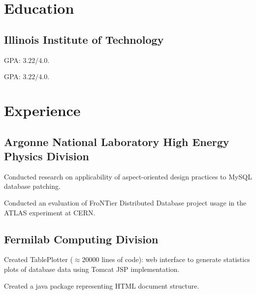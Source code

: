 \documentclass{resume}
\begin{document}
\author{Dmitry Ratnikov}
\maketitle

\section{Education}

\subsection{Illinois Institute of Technology}

\begin{compactitem}
  \item GPA: $3.22/4.0$.
\end{compactitem}

\begin{compactitem}
  \item GPA: $3.22/4.0$.
\end{compactitem}

\section{Experience}

\subsection{Argonne National Laboratory High Energy Physics Division}
\begin{compactitem}
  \item Conducted research on applicability of aspect-oriented design practices to MySQL database patching.
  \item Conducted an evaluation of FroNTier Distributed Database project usage in the ATLAS experiment at CERN.
\end{compactitem}

\subsection{Fermilab Computing Division}
\begin{compactitem}
  \item Created TablePlotter ($\approx 20000$ lines of code): web interface to generate statistics plots of database data using Tomcat JSP implementation.
  \item Created a java package representing HTML document structure.
\end{compactitem}
\end{document}
